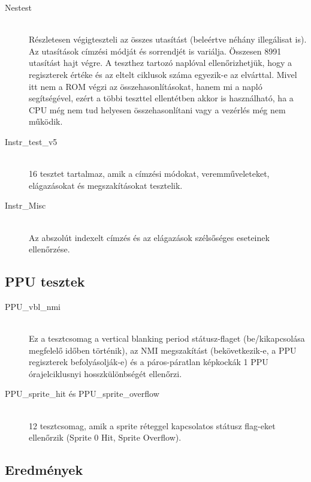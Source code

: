 \begin{description}
\item[Nestest] \hfill \\
Részletesen végigteszteli az összes utasítást (beleértve néhány illegálisat is). Az utasítások címzési módját és sorrendjét is variálja. Összesen 8991 utasítást hajt végre. A teszthez tartozó naplóval ellenőrizhetjük, hogy a regiszterek értéke és az eltelt ciklusok száma egyezik-e az elvárttal. Mivel itt nem a ROM végzi az összehasonlításokat, hanem mi a napló segítségével, ezért a többi teszttel ellentétben akkor is használható, ha a CPU még nem tud helyesen összehasonlítani vagy a vezérlés még nem működik. 

\item[Instr\_test\_v5] \hfill \\
16 tesztet tartalmaz, amik a címzési módokat, veremműveleteket, elágazásokat és megszakításokat tesztelik.

\item[Instr\_Misc] \hfill \\
Az abszolút indexelt címzés és az elágazások szélsőséges eseteinek ellenőrzése.

\end{description}

\subsection{PPU tesztek}

\begin{description}
\item[PPU\_vbl\_nmi] \hfill \\
Ez a tesztcsomag a vertical blanking period státusz-flaget (be/kikapcsolása megfelelő időben történik), az NMI megszakítást (bekövetkezik-e, a PPU regiszterek befolyásolják-e) és a páros-páratlan képkockák 1 PPU órajelciklusnyi hosszkülönbségét ellenőrzi.

\item[PPU\_sprite\_hit és PPU\_sprite\_overflow] \hfill \\
12 tesztcsomag, amik a sprite réteggel kapcsolatos státusz flag-eket ellenőrzik (Sprite 0 Hit, Sprite Overflow).

\end{description}

\subsection{Eredmények}
\label{results}

